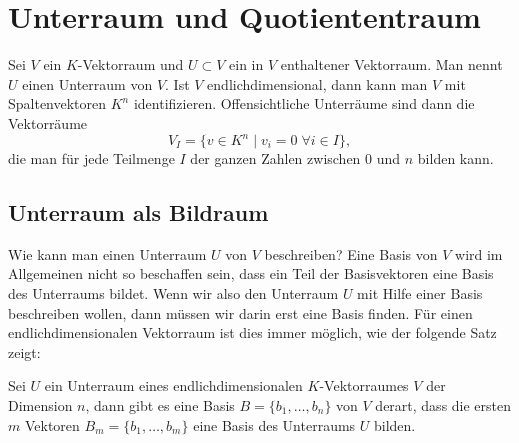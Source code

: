 %
%
%
\section{Unterraum und Quotiententraum}
Sei $V$ ein $K$-Vektorraum und $U\subset V$ ein in $V$ enthaltener
Vektorraum.
Man nennt $U$ einen Unterraum von $V$.
Ist $V$ endlichdimensional, dann kann man $V$ mit Spaltenvektoren $K^n$
identifizieren.
Offensichtliche Unterräume sind dann die Vektorräume
\[
V_I
=
\{ v\in K^n\;|\; v_i = 0\;\forall i\in I\},
\]
die man für jede Teilmenge $I$ der ganzen Zahlen zwischen 0 und $n$ 
bilden kann.

\subsection{Unterraum als Bildraum}
Wie kann man einen Unterraum $U$ von $V$ beschreiben?
Eine Basis von $V$ wird im Allgemeinen nicht so beschaffen sein,
dass ein Teil der Basisvektoren eine Basis des Unterraums bildet.
Wenn wir also den Unterraum $U$ mit Hilfe einer Basis beschreiben
wollen, dann müssen wir darin erst eine Basis finden.
Für einen endlichdimensionalen Vektorraum ist dies immer möglich,
wie der folgende Satz zeigt:

\begin{satz}
\label{quotient:basiserweiterung}
Sei $U$ ein Unterraum eines endlichdimensionalen $K$-Vektorraumes $V$
der Dimension $n$,
dann gibt es eine Basis $B=\{b_1,\dots,b_n\}$ von $V$ derart, dass
die ersten $m$ Vektoren $B_m=\{b_1,\dots,b_m\}$ eine Basis des Unterraums
$U$ bilden.
\end{satz}

